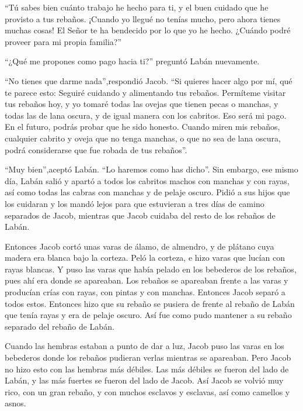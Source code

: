  ``Tú sabes bien cuánto trabajo he hecho para ti, y el buen
cuidado que he provisto a tus rebaños.  ¡Cuando yo llegué
no tenías mucho, pero ahora tienes muchas cosas! El Señor te ha
bendecido por lo que yo he hecho. ¿Cuándo podré proveer para mi propia
familia?''

 ``¿Qué me propones como pago hacia ti?'' preguntó Labán
nuevamente.

``No tienes que darme nada'',respondió Jacob. ``Si quieres hacer algo
por mí, qué te parece esto: Seguiré cuidando y alimentando tus rebaños.
 Permíteme visitar tus rebaños hoy, y yo tomaré todas las
ovejas que tienen pecas o manchas, y todas las de lana oscura, y de
igual manera con los cabritos. Eso será mi pago.  En el
futuro, podrás probar que he sido honesto. Cuando miren mis rebaños,
cualquier cabrito y oveja que no tenga manchas, o que no sea de lana
oscura, podrá considerarse que fue robada de tus rebaños''.

 ``Muy bien'',aceptó Labán. ``Lo haremos como has dicho''.
 Sin embargo, ese mismo día, Labán salió y apartó a todos
los cabritos machos con manchas y con rayas, así como todas las cabras
con manchas y de pelaje oscuro. Pidió a sus hijos que los cuidaran y los
mandó lejos  para que estuvieran a tres días de camino
separados de Jacob, mientras que Jacob cuidaba del resto de los rebaños
de Labán.

 Entonces Jacob cortó unas varas de álamo, de almendro, y
de plátano cuya madera era blanca bajo la corteza. Peló la corteza, e
hizo varas que lucían con rayas blancas.  Y puso las varas
que había pelado en los bebederos de los rebaños, pues ahí era donde se
apareaban.  Los rebaños se apareaban frente a las varas y
producían crías con rayas, con pintas y con manchas. 
Entonces Jacob separó a todos estos. Entonces hizo que su rebaño se
pusiera de frente al rebaño de Labán que tenía rayas y era de pelaje
oscuro. Así fue como pudo mantener a su rebaño separado del rebaño de
Labán.

 Cuando las hembras estaban a punto de dar a luz, Jacob
puso las varas en los bebederos donde los rebaños pudieran verlas
mientras se apareaban.  Pero Jacob no hizo esto con las
hembras más débiles. Las más débiles se fueron del lado de Labán, y las
más fuertes se fueron del lado de Jacob.  Así Jacob se
volvió muy rico, con un gran rebaño, y con muchos esclavos y esclavas,
así como camellos y asnos.


